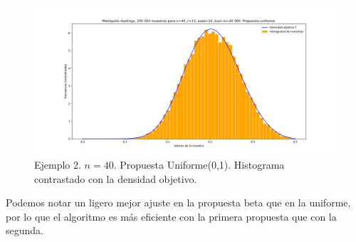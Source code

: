 \documentclass[letterpaper]{article}
\newcommand{\1}{\mathds{1}}
\theoremstyle{definition}
\theoremstyle{definition}
\theoremstyle{definition}
\theoremstyle{definition}
\theoremstyle{definition}
\begin{document}
\begin{enumerate}
\begin{figure}[h!]
    \centering
    \includegraphics[width=\linewidth]{10.png}
    \caption{Ejemplo 2. $n=40$. Propuesta Uniforme(0,1). Histograma contrastado con la densidad objetivo.}
\end{figure}
Podemos notar un ligero mejor ajuste en la propuesta beta que en la uniforme, por lo que el algoritmo es más eficiente con la primera propuesta 
que con la segunda.
\end{enumerate}
\end{document}

